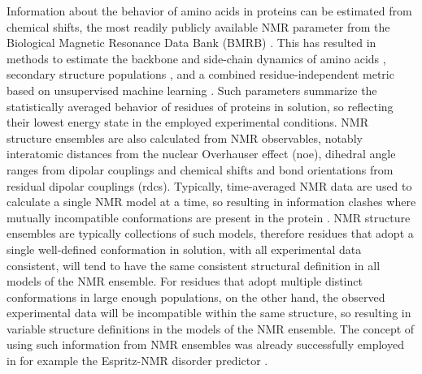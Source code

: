Information about the behavior of amino acids in proteins can be estimated from chemical shifts, the most readily publicly available NMR parameter from the Biological Magnetic Resonance Data Bank (BMRB) \cite{hoch_biological_2023}. This has resulted in methods to estimate the backbone and side-chain dynamics of amino acids \cite{berjanskii_simple_2005, berjanskii_simple_2013}, secondary structure populations \cite{camilloni_determination_2012}, and a combined residue-independent metric based on unsupervised machine learning \cite{orlando_auto-encoding_2019}. Such parameters summarize the statistically averaged behavior of residues of proteins in solution, so reflecting their lowest energy state in the employed experimental conditions. NMR structure ensembles are also calculated from NMR observables, notably interatomic distances from the nuclear Overhauser effect (\gls{noe}), dihedral angle ranges from dipolar couplings and chemical shifts and bond orientations from residual dipolar couplings (\gls{rdcs}). Typically, time-averaged NMR data are used to calculate a single NMR model at a time, so resulting in information clashes where mutually incompatible conformations are present in the protein \cite{vranken_nmr_2014}. NMR structure ensembles are typically collections of such models, therefore residues that adopt a single well-defined conformation in solution, with all experimental data consistent, will tend to have the same consistent structural definition in all models of the NMR ensemble. For residues that adopt multiple distinct conformations in large enough populations, on the other hand, the observed experimental data will be incompatible within the same structure, so resulting in variable structure definitions in the models of the NMR ensemble. The concept of using such information from NMR ensembles was already successfully employed in for example the Espritz-NMR disorder predictor \cite{walsh_espritz_2012}.


